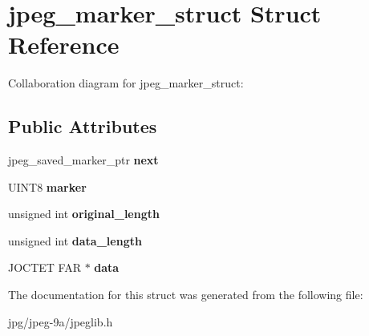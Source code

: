 \hypertarget{structjpeg__marker__struct}{\section{jpeg\+\_\+marker\+\_\+struct Struct Reference}
\label{structjpeg__marker__struct}
}


Collaboration diagram for jpeg\+\_\+marker\+\_\+struct\+:
\subsection*{Public Attributes}
\begin{DoxyCompactItemize}
\item 
\hypertarget{structjpeg__marker__struct_a1cb619806ea91b42a46b2a04fafabd82}{jpeg\+\_\+saved\+\_\+marker\+\_\+ptr {\bfseries next}}\label{structjpeg__marker__struct_a1cb619806ea91b42a46b2a04fafabd82}

\item 
\hypertarget{structjpeg__marker__struct_a154cf70fc9b4f86da631ca08a12a8d33}{U\+I\+N\+T8 {\bfseries marker}}\label{structjpeg__marker__struct_a154cf70fc9b4f86da631ca08a12a8d33}

\item 
\hypertarget{structjpeg__marker__struct_a3b17d58a17fa6be8560b697da814dfd3}{unsigned int {\bfseries original\+\_\+length}}\label{structjpeg__marker__struct_a3b17d58a17fa6be8560b697da814dfd3}

\item 
\hypertarget{structjpeg__marker__struct_a98412e9bccde6954ce55f611ad146a6b}{unsigned int {\bfseries data\+\_\+length}}\label{structjpeg__marker__struct_a98412e9bccde6954ce55f611ad146a6b}

\item 
\hypertarget{structjpeg__marker__struct_ac8d0d5b3294a6ac3629640d4164a1ea6}{J\+O\+C\+T\+E\+T F\+A\+R $\ast$ {\bfseries data}}\label{structjpeg__marker__struct_ac8d0d5b3294a6ac3629640d4164a1ea6}

\end{DoxyCompactItemize}


The documentation for this struct was generated from the following file\+:\begin{DoxyCompactItemize}
\item 
jpg/jpeg-\/9a/jpeglib.\+h\end{DoxyCompactItemize}
